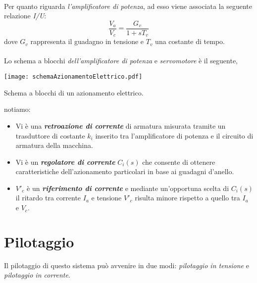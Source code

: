 \paragraph{}
Per quanto riguarda \emph{l'amplificatore di potenza}, ad esso viene associata la seguente relazione \emph{I/U}:
\begin{equation}
	\frac{V_a}{V_c} = \frac{G_v}{1 + sT_v}
\end{equation}
dove $G_v$ rappresenta il guadagno in tensione e $T_v$ una costante di tempo.
\paragraph{}
Lo schema a blocchi \emph{dell'amplificatore di potenza} e \emph{servomotore} è il seguente,
\begin{center}
	\texttt{[image: schemaAzionamentoElettrico.pdf]}
	\caption{Schema a blocchi di un azionamento elettrico.}
\end{center}
notiamo:
\begin{itemize}
	\item Vi è una \textbf{\emph{retroazione di corrente}} di armatura misurata tramite un trasduttore di costante $k_i$ inserito tra l'amplificatore di potenza e il circuito di armatura della macchina.
	\item Vi è un \textbf{\emph{regolatore di corrente}} $C_i(s)$ che consente di ottenere caratteristiche dell'azionamento particolari in base ai guadagni d'anello.
	\item $V'_c$ è un \textbf{\emph{riferimento di corrente}} e mediante un'opportuna scelta di $C_i(s)$ il ritardo tra corrente $I_a$ e tensione $V'_c$ risulta minore rispetto a quello tra $I_a$ e $V_c$.
\end{itemize}

\section{Pilotaggio}
Il pilotaggio di questo sistema può avvenire in due modi: \emph{pilotaggio in tensione} e \emph{pilotaggio in corrente}. 

